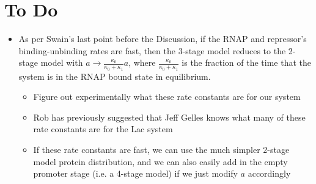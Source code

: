 \pagebreak
\phantom{This ensures that the next section starts on a new page}
\pagebreak
\section{To Do}

\begin{itemize}	
%		
%		
	
	\item As per Swain's last point before the Discussion, if the RNAP and repressor's binding-unbinding rates are fast, then the 3-stage model reduces to the 2-stage model with $a \to \frac{\kappa_0}{\kappa_0 + \kappa_1} a$, where $\frac{\kappa_0}{\kappa_0 + \kappa_1}$ is the fraction of the time that the system is in the RNAP bound state in equilibrium.
	\begin{itemize}
		\item Figure out experimentally what these rate constants are for our system
		
		\item Rob has previously suggested that Jeff Gelles knows what many of these rate constants are for the Lac system
		
		\item If these rate constants are fast, we can use the much simpler 2-stage model protein distribution, and we can also easily add in the empty promoter stage (i.e. a 4-stage model) if we just modify $a$ accordingly
	\end{itemize}
	

\end{itemize}
